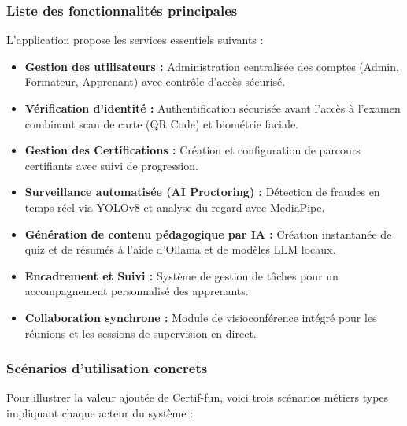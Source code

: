 \subsubsection{Liste des fonctionnalités principales}
L'application propose les services essentiels suivants :
\begin{itemize}
    \item \textbf{Gestion des utilisateurs :} Administration centralisée des comptes (Admin, Formateur, Apprenant) avec contrôle d'accès sécurisé.
    \item \textbf{Vérification d'identité :} Authentification sécurisée avant l'accès à l'examen combinant scan de carte (QR Code) et biométrie faciale.
    \item \textbf{Gestion des Certifications :} Création et configuration de parcours certifiants avec suivi de progression.
    \item \textbf{Surveillance automatisée (AI Proctoring) :} Détection de fraudes en temps réel via YOLOv8 et analyse du regard avec MediaPipe.
    \item \textbf{Génération de contenu pédagogique par IA :} Création instantanée de quiz et de résumés à l'aide d'Ollama et de modèles LLM locaux.
    \item \textbf{Encadrement et Suivi :} Système de gestion de tâches pour un accompagnement personnalisé des apprenants.
    \item \textbf{Collaboration synchrone :} Module de visioconférence intégré pour les réunions et les sessions de supervision en direct.
\end{itemize}

\subsubsection{Scénarios d'utilisation concrets}
Pour illustrer la valeur ajoutée de Certif-fun, voici trois scénarios métiers types impliquant chaque acteur du système :

